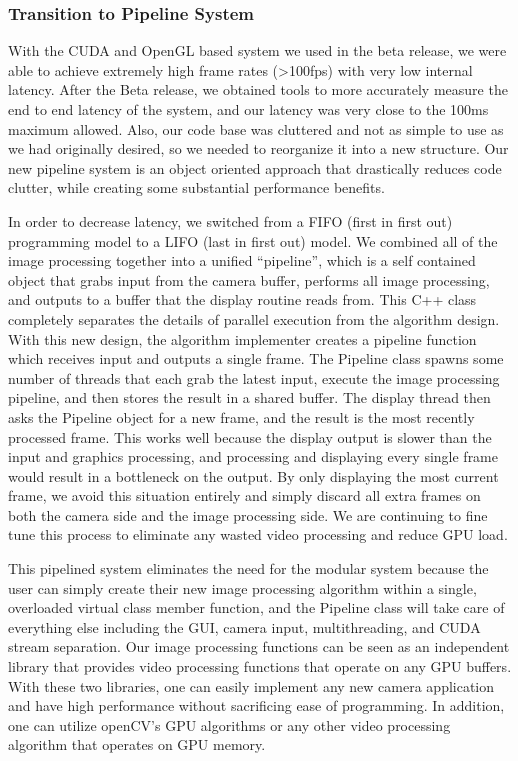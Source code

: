 \documentclass[letterpaper,10pt,titlepage]{IEEEtran}
\begin{document}
    \subsubsection{Transition to Pipeline System}
        \par With the CUDA and OpenGL based system we used in the beta release, we were able to achieve extremely high frame rates (>100fps) with very low internal latency. After the Beta release, we obtained tools to more accurately measure the end to end latency of the system, and our latency was very close to the 100ms maximum allowed. Also, our code base was cluttered and not as simple to use as we had originally desired, so we needed to reorganize it into a new structure. Our new pipeline system is an object oriented approach that drastically reduces code clutter, while creating some substantial performance benefits.
        \par In order to decrease latency, we switched from a FIFO (first in first out) programming model to a LIFO (last in first out)  model. We combined all of the image processing together into a unified “pipeline”, which is a self contained object that grabs input from the camera buffer, performs all image processing, and outputs to a buffer that the display routine reads from. This C++ class completely separates the details of parallel execution from the algorithm design. With this new design, the algorithm implementer creates a pipeline function which receives input  and outputs a single frame. The Pipeline class spawns some number of threads that each grab the latest input, execute the image processing pipeline, and then stores the result in a shared buffer. The display thread then asks the Pipeline object for a new frame, and the result is the most recently processed frame. This works well because the display output is slower than the input and graphics processing, and processing and displaying every single frame would result in a bottleneck on the output. By only displaying the most current frame, we avoid this situation entirely and simply discard all extra frames on both the camera side and the image processing side. We are continuing to fine tune this process to eliminate any wasted video processing and reduce GPU load.
        \par This pipelined system eliminates the need for the modular system because the user can simply create their new image processing algorithm within a single, overloaded virtual class member function, and the Pipeline class will take care of everything else including the GUI, camera input, multithreading, and CUDA stream separation. Our image processing functions can be seen as an independent library that provides video processing functions that operate on any GPU buffers. With these two libraries, one can easily implement any new camera application and have high performance without sacrificing ease of programming. In addition, one can utilize openCV’s GPU algorithms or any other video processing algorithm that operates on GPU memory.
\end{document}
